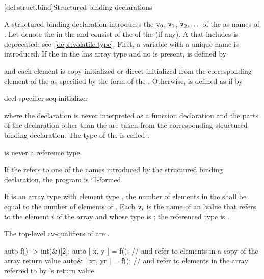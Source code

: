 \documentclass{wg21}
\begin{document}
[dcl.struct.bind]{Structured binding declarations}%

\pnum
A structured binding declaration introduces the 
$\texttt{v}_0$, $\texttt{v}_1$, $\texttt{v}_2, \dotsc$
of the
 as names
of .
Let \cv{} denote the  in
the  and
 consist of the  of
the  (if any).
A \cv{} that includes  is deprecated;
see~\ref{depr.volatile.type}.
First, a variable with a unique name  is introduced. If the
 in the 
has array type   and no  is present,
 is defined by
\begin{ncbnf}
      \cv{}   \terminal{;}
\end{ncbnf}
and each element is copy-initialized or direct-initialized
from the corresponding element of the  as specified
by the form of the .
Otherwise, 
is defined as-if by
\begin{ncbnf}
     decl-specifier-seq   initializer \terminal{;}
\end{ncbnf}
where
the declaration is never interpreted as a function declaration and
the parts of the declaration other than the  are taken
from the corresponding structured binding declaration.
The type of the 
 is called .
\begin{note}
     is never a reference type.
\end{note}

\pnum
If the  refers to
one of the names introduced by the structured binding declaration,
the program is ill-formed.

\pnum
If  is an array type with element type , the number
of elements in the  shall be equal to the
number of elements of . Each $\texttt{v}_i$ is the name of an
lvalue that refers to the element $i$ of the array and whose type
is ; the referenced type is .
\begin{note}
    The top-level cv-qualifiers of  are \cv.
\end{note}
\begin{example}
    \begin{codeblock}
        auto f() -> int(&)[2];
        auto [ x, y ] = f();            //  and  refer to elements in a copy of the array return value
        auto& [ xr, yr ] = f();         //  and  refer to elements in the array referred to by 's return value
    \end{codeblock}
\end{example}
\end{document}
